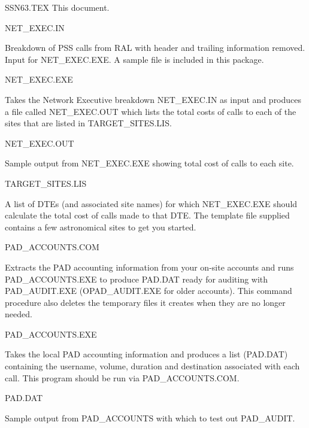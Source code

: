 \newlength{\numlen}
\settowidth{\numlen}{0000000000000000000000}
\settowidth{\labelsep}{000}
\begin{list}{}{\setlength{\labelwidth}{\numlen}
\setlength{\leftmargin}{\numlen}
\addtolength{\leftmargin}{\labelsep}}

\item [SSN63.TEX] This document.

\item [NET\_\/EXEC.IN]                     

Breakdown of PSS calls from RAL 
with header and trailing information
removed. Input for NET\_\/EXEC.EXE.
A sample file is included in this 
package.

\item [NET\_\/EXEC.EXE]

Takes the Network Executive breakdown
NET\_\/EXEC.IN as input and produces a file
called NET\_\/EXEC.OUT which lists 
the total costs of calls to each of 
the sites that are 
listed in TARGET\_\/SITES.LIS. 

\item [NET\_\/EXEC.OUT]

Sample output from NET\_\/EXEC.EXE showing
total cost of calls to each site.

\item [TARGET\_\/SITES.LIS]

A list of DTEs (and associated site names)
for which NET\_\/EXEC.EXE should calculate
the total cost of calls made to that DTE.
The template file supplied contains a few
astronomical sites to get you started.

\item [PAD\_\/ACCOUNTS.COM]

Extracts the PAD accounting information 
from your on-site accounts and runs
PAD\_\/ACCOUNTS.EXE to produce PAD.DAT
ready for auditing with PAD\_\/AUDIT.EXE
(OPAD\_\/AUDIT.EXE for older accounts).
This command procedure also deletes the
temporary files it creates when they are 
no longer needed.

\item [PAD\_\/ACCOUNTS.EXE]

Takes the local PAD accounting information
and produces a list (PAD.DAT) containing
the username, volume, duration
and destination associated with each call.
This program should be run via
PAD\_\/ACCOUNTS.COM.

\item [PAD.DAT]

Sample output from PAD\_\/ACCOUNTS with which
to test out PAD\_\/AUDIT.


\end{list}
